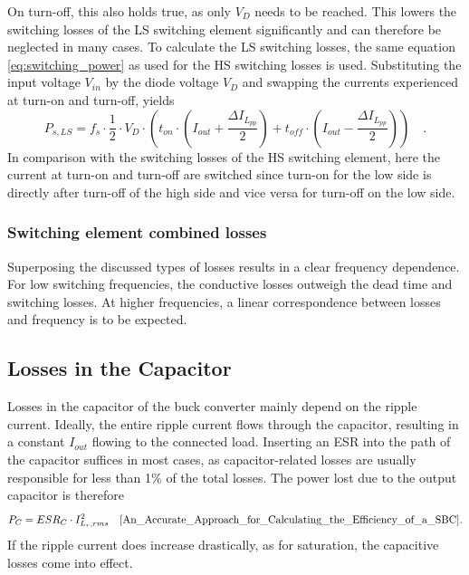 On turn-off, this also holds true, as only $V_D$ needs to be reached. This lowers the switching losses of the \ac{LS} switching element significantly and can therefore be neglected in many cases. To calculate the \ac{LS} switching losses, the same equation \ref{eq:switching_power} as used for the \ac{HS} switching losses is used. Substituting the input voltage $V_{in}$ by the diode voltage $V_D$ and swapping the currents experienced at turn-on and turn-off, yields
\begin{equation}\label{eq:switching_power_LS}
    P_{s,LS} = f_s \cdot \frac{1}{2} \cdot V_D \cdot (t_{on} \cdot (I_{out} + \frac{\Delta I_{L_{pp}}}{2}) + t_{off} \cdot (I_{out} - \frac{\Delta I_{L_{pp}}}{2})) \quad\text{.}
\end{equation}
In comparison with the switching losses of the \ac{HS} switching element, here the current at turn-on and turn-off are switched since turn-on for the low side is directly after turn-off of the high side and vice versa for turn-off on the low side.
\subsubsection{Switching element combined losses}
Superposing the discussed types of losses results in a clear frequency dependence. For low switching frequencies, the conductive losses outweigh the dead time and switching losses. At higher frequencies, a linear correspondence between losses and frequency is to be expected. 

\subsection{Losses in the Capacitor}\label{sec:losses_in_the_capacitor}
Losses in the capacitor of the buck converter mainly depend on the ripple current. Ideally, the entire ripple current flows through the capacitor, resulting in a constant $I_{out}$ flowing to the connected load. Inserting an \ac{ESR} into the path of the capacitor suffices in most cases, as capacitor-related losses are usually responsible for less than 1\% of the total losses.
The power lost due to the output capacitor is therefore 
\begin{equation}
    P_C = ESR_C \cdot I_{L_r,rms}^2 \quad\text{\cite{An_Accurate_Approach_for_Calculating_the_Efficiency_of_a_SBC}.}
\end{equation}
If the ripple current does increase drastically, as for saturation, the capacitive losses come into effect.


